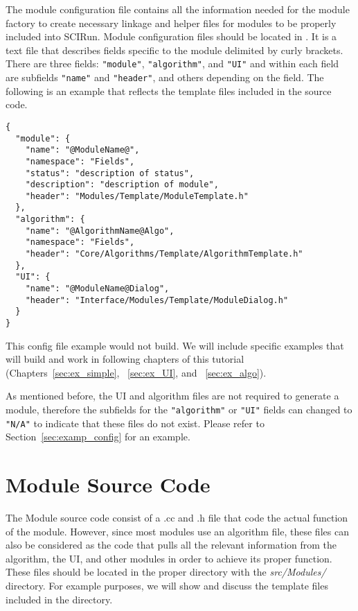 \documentclass[fleqn,11pt,openany]{book}
\begin{document}
The module configuration file contains all the information needed for the module factory to create necessary linkage and helper files for modules to be properly included into SCIRun.  
Module configuration files should be located in \emph{}.  
It is a text file that describes fields specific to the module delimited by curly brackets.  
There are three fields: \verb|"module"|, \verb|"algorithm"|, and \verb|"UI"| and within each field are subfields \verb|"name"| and \verb|"header"|, and others depending on the field.  
The following is an example that reflects the template files included in the source code.
\begin{verbatim}
{
  "module": {
    "name": "@ModuleName@",
    "namespace": "Fields",
    "status": "description of status",
    "description": "description of module",
    "header": "Modules/Template/ModuleTemplate.h"
  },
  "algorithm": {
    "name": "@AlgorithmName@Algo",
    "namespace": "Fields",
    "header": "Core/Algorithms/Template/AlgorithmTemplate.h"
  },
  "UI": {
    "name": "@ModuleName@Dialog",
    "header": "Interface/Modules/Template/ModuleDialog.h"
  }
}
\end{verbatim}
This config file example would not build.  
We will include specific examples that will build and work in following chapters of this tutorial (Chapters~\ref{sec:ex_simple}, ~\ref{sec:ex_UI}, and ~\ref{sec:ex_algo}).

As mentioned before, the UI and algorithm files are not required to generate a module, therefore the subfields for the \verb|"algorithm"| or \verb|"UI"| fields can changed to \verb|"N/A"| to indicate that these files do not exist.  
Please refer to Section~\ref{sec:examp_config} for an example. 

\section{Module Source Code}
\label{sec:module}

The Module source code consist of a .cc and .h file that code the actual function of the module.
However, since most modules use an algorithm file, these files can also be considered as the code that pulls all the relevant information from the algorithm, the UI, and other modules in order to achieve its proper function.  
These files should be located in the proper directory with the \emph{src/Modules/} directory.
For example purposes, we will show and discuss the template files included in the \emph{} directory.
\end{document}
